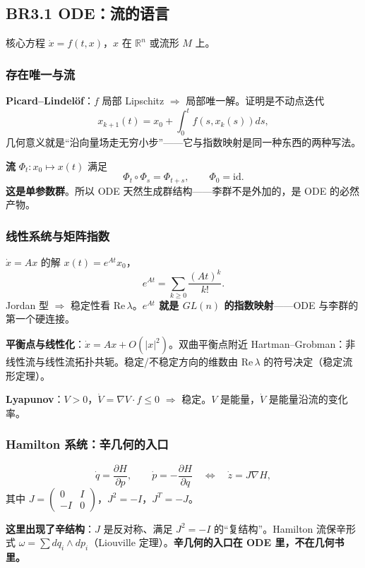 \subsection{BR3.1 ODE：流的语言}

核心方程 $\dot x=f(t,x)$，$x$ 在 $\mathbb{R}^n$ 或流形 $M$ 上。

\subsubsection{存在唯一与流}

\textbf{Picard--Lindelöf}：$f$ 局部 Lipschitz $\Rightarrow$ 局部唯一解。证明是不动点迭代
\[
x_{k+1}(t)=x_0+\int_0^t f(s,x_k(s))ds,
\]
几何意义就是“沿向量场走无穷小步”——它与指数映射是同一种东西的两种写法。

\textbf{流} $\Phi_t:x_0\mapsto x(t)$ 满足
\[
\Phi_t\circ\Phi_s=\Phi_{t+s},\qquad \Phi_0=\mathrm{id}.
\]
\textbf{这是单参数群}。所以 ODE 天然生成群结构——李群不是外加的，是 ODE 的必然产物。

\subsubsection{线性系统与矩阵指数}

$\dot x=Ax$ 的解 $x(t)=e^{At}x_0$，
\[
e^{At}=\sum_{k\ge0}\frac{(At)^k}{k!}.
\]
Jordan 型 $\Rightarrow$ 稳定性看 $\mathrm{Re}\,\lambda$。\textbf{$e^{At}$ 就是 $GL(n)$ 的指数映射}——ODE 与李群的第一个硬连接。

\textbf{平衡点与线性化}：$\dot x=Ax+O(|x|^2)$。双曲平衡点附近 Hartman--Grobman：非线性流与线性流拓扑共轭。稳定/不稳定方向的维数由 $\mathrm{Re}\,\lambda$ 的符号决定（稳定流形定理）。

\textbf{Lyapunov}：$V>0$，$\dot V=\nabla V\cdot f\le0$ $\Rightarrow$ 稳定。$V$ 是能量，$\dot V$ 是能量沿流的变化率。

\subsubsection{Hamilton 系统：辛几何的入口}

\[
\dot q=\frac{\partial H}{\partial p},\qquad
\dot p=-\frac{\partial H}{\partial q}
\quad\Longleftrightarrow\quad
\dot z=J\nabla H,
\]
其中 $J=\begin{pmatrix}0&I\\-I&0\end{pmatrix}$，$J^2=-I$，$J^T=-J$。

\textbf{这里出现了辛结构}：$J$ 是反对称、满足 $J^2=-I$ 的“复结构”。Hamilton 流保辛形式 $\omega=\sum dq_i\wedge dp_i$（Liouville 定理）。\textbf{辛几何的入口在 ODE 里，不在几何书里。}

